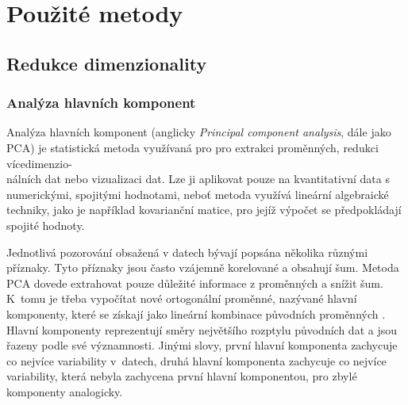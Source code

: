 \chapter{Použité metody}




\section{Redukce dimenzionality} %

\subsection{Analýza hlavních komponent}

Analýza hlavních komponent (anglicky \emph{Principal component analysis}, dále jako PCA) je statistická metoda využívaná pro pro extrakci proměnných, redukci vícedimenzio-\\nálních dat nebo vizualizaci dat. Lze ji aplikovat pouze na kvantitativní data s numerickými, spojitými hodnotami, neboť metoda využívá lineární algebraické techniky, jako je například kovarianční matice, pro jejíž výpočet se předpokládají spojité hodnoty. 

Jednotlivá pozorování obsažená v datech bývají popsána několika různými příznaky. Tyto příznaky jsou často vzájemně korelované a obsahují šum. Metoda PCA dovede extrahovat pouze důležité informace z proměnných a snížit šum. K~tomu je třeba vypočítat nové ortogonální proměnné, nazývané hlavní komponenty, které se získají jako lineární kombinace původních proměnných \cite{bib:PCA1}. Hlavní komponenty reprezentují směry největšího rozptylu původních dat a jsou řazeny podle své významnosti. Jinými slovy, první hlavní komponenta zachycuje co nejvíce variability v~datech, druhá hlavní komponenta zachycuje co nejvíce variability, která nebyla zachycena první hlavní komponentou, pro zbylé komponenty analogicky. \cite{bib:PCA3}

